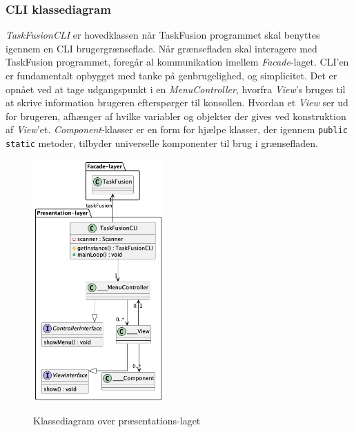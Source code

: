 \subsubsection{CLI klassediagram}
\textit{TaskFusionCLI} er hovedklassen når TaskFusion programmet skal benyttes igennem en CLI brugergrænseflade. Når grænsefladen skal interagere med TaskFusion programmet, foregår al kommunikation imellem \textit{Facade}-laget. CLI'en er fundamentalt opbygget med tanke på genbrugelighed, og simplicitet. Det er opnået ved at tage udgangspunkt i en \textit{MenuController}, hvorfra \textit{View}'s bruges til at skrive information brugeren efterspørger til konsollen. Hvordan et \textit{View} ser ud for brugeren, afhænger af hvilke variabler og objekter der gives ved konstruktion af \textit{View}'et. \textit{Component}-klasser er en form for hjælpe klasser, der igennem \texttt{public static} metoder, tilbyder universelle komponenter til brug i grænsefladen.
\begin{figure}[H]
    \centering
    \caption{Klassediagram over præsentations-laget}
    \includegraphics[width = 5cm]{TaskFusion/out/assets/diagrams/class_cli/TaskFusion-CLI.png}
    \label{fig:class_cli}
\end{figure}
